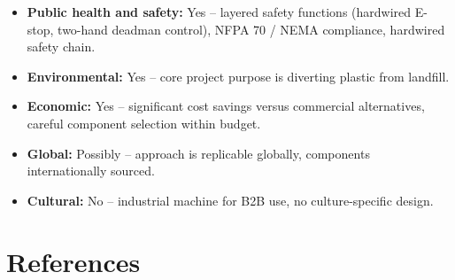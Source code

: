 \documentclass[hidelinks,12pt]{article}
\begin{document}
\begin{itemize}
    \item \textbf{Public health and safety:} Yes -- layered safety functions (hardwired E-stop, two-hand deadman control), NFPA 70 / NEMA compliance, hardwired safety chain.
    \item \textbf{Environmental:} Yes -- core project purpose is diverting plastic from landfill.
    \item \textbf{Economic:} Yes -- significant cost savings versus commercial alternatives, careful component selection within budget.
    \item \textbf{Global:} Possibly -- approach is replicable globally, components internationally sourced.
    \item \textbf{Cultural:} No -- industrial machine for B2B use, no culture-specific design.
\end{itemize}

\section{References}
\end{document}
